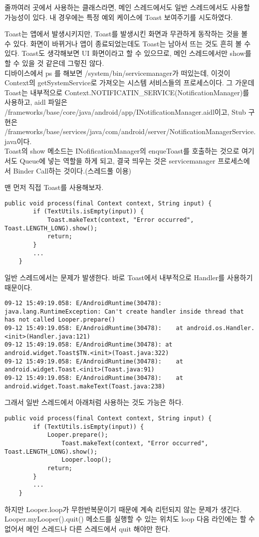 줄까여러 곳에서 사용하는 클래스라면, 메인 스레드에서도 일반 스레드에서도 사용할 가능성이 있다. 내 경우에는 특정 예외 케이스에 Toast 보여주기를 시도하였다.

\colorbox{backcolour}{\parbox[t]{15cm}{
Toast는 앱에서 발생시키지만, Toast를 발생시킨 화면과 무관하게 동작하는 것을 볼 수 있다. 화면이 바뀌거나 앱이 종료되었는데도 Toast는 남아서 뜨는 것도 흔히 볼 수 있다.
Toast도 생각해보면 UI 화면이라고 할 수 있으므로, 메인 스레드에서만 show를 할 수 있을 것 같은데 그렇진 않다.\\
디바이스에서 ps 를 해보면 /system/bin/servicemanager가 떠있는데, 이것이 Context의 getSystemService로 가져오는 시스템 서비스들의 프로세스이다. 그 가운데 Toast는 내부적으로 Context.NOTIFICATIN\_SERVICE(NotificationManager)를 사용하고, aidl 파일은 /frameworks/base/core/java/android/app/INotificationManager.aidl이고, Stub 구현은 /frameworks/base/services/java/com/android/server/NotificationManagerService.java이다.\\
Toast의 show 메소드는 INofificationManager의 enqueToast를 호출하는 것으로 여기서도 Queue에 넣는 역할을 하게 되고, 결국 띄우는 것은 servicemanager 프로세스에서 Binder Call하는 것이다.(스레드풀 이용)
}}\newline \newline


맨 먼저 직접 Toast를 사용해보자.
\begin{lstlisting}[frame=single] 
	public void process(final Context context, String input) {
		if (TextUtils.isEmpty(input)) {
			Toast.makeText(context, "Error occurred", Toast.LENGTH_LONG).show();
			return;
		}
		...
	}
\end{lstlisting}	
일반 스레드에서는 문제가 발생한다. 바로 Toast에서 내부적으로 Handler를 사용하기 때문이다.
\begin{lstlisting}[frame=single] 
09-12 15:49:19.058: E/AndroidRuntime(30478): java.lang.RuntimeException: Can't create handler inside thread that has not called Looper.prepare()
09-12 15:49:19.058: E/AndroidRuntime(30478): 	at android.os.Handler.<init>(Handler.java:121)
09-12 15:49:19.058: E/AndroidRuntime(30478): at android.widget.Toast$TN.<init>(Toast.java:322)
09-12 15:49:19.058: E/AndroidRuntime(30478): 	at android.widget.Toast.<init>(Toast.java:91)
09-12 15:49:19.058: E/AndroidRuntime(30478): 	at android.widget.Toast.makeText(Toast.java:238)
\end{lstlisting}	

그래서 일반 스레드에서 아래처럼 사용하는 것도 가능은 하다.
\begin{lstlisting}[frame=single] 
	public void process(final Context context, String input) {
		if (TextUtils.isEmpty(input)) {
			Looper.prepare();
	        	Toast.makeText(context, "Error occurred", Toast.LENGTH_LONG).show();
	        	Looper.loop();
			return;
		}
		...
	}
\end{lstlisting}
하지만 Looper.loop가 무한반복문이기 때문에 계속 리턴되지 않는 문제가 생긴다. Looper.myLooper().quit() 메소드를 실행할 수 있는 위치도 loop 다음 라인에는 할 수 없어서 메인 스레드나 다른 스레드에서 quit 해야만 한다.
	
